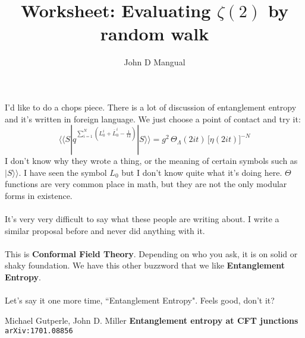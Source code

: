 \documentclass[12pt]{article}
\title{Worksheet: Evaluating $\zeta(2)$ by random walk}
\author{John D Mangual}
\date{}
\begin{document}
\selectfont \fontsize{12.5}{15}\selectfont

\maketitle

\noindent I'd like to do a chops piece.  There is a lot of discussion of entanglement entropy and it's written in foreign language.  We just choose a point of contact and try it:
$$ \langle \langle S | q^{\sum_{i=1}^N (L^i_0 + \overline{L}^i_0 - \frac{1}{12} ) }   | S \rangle \rangle = g^2 \, \Theta_\Lambda (2it) \, \big[\eta(2it) \big]^{-N} $$
I don't know why they wrote a thing, or the meaning of certain symbols such as $| S \rangle\rangle$.   I have seen the symbol $L_0$ but I don't know quite what it's doing here.  $\Theta$ functions are very common place in math, but they are not the only modular forms in existence. \\ \\
It's very very difficult to say what these people are writing about.  I write a similar proposal before and never did anything with it. \\ \\
This is \textbf{Conformal Field Theory}.  Depending on who you ask, it is on solid or shaky foundation. We have this other buzzword that we like {\color{red!50!yellow!50!green}\textbf{Entanglement Entropy}}. \\ \\
Let's say it one more time, ``Entanglement Entropy".  Feels good, don't it?


 
\vfill

\begin{thebibliography}{}

\item Michael Gutperle, John D. Miller \textbf{Entanglement entropy at CFT junctions} \texttt{arXiv:1701.08856}

\end{thebibliography}
\end{document}
